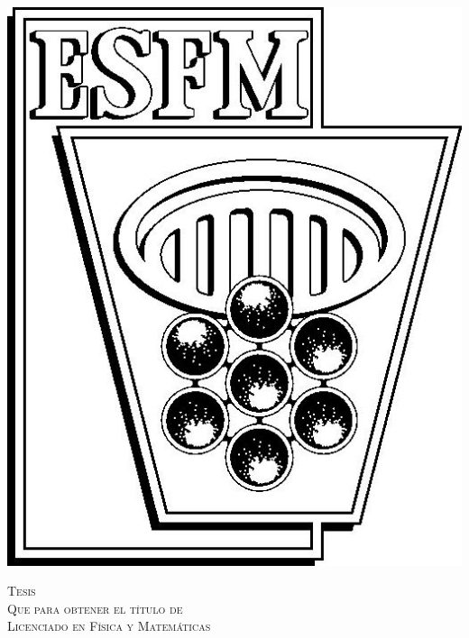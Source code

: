 \begin{center}
\begin{minipage}{0.1\textwidth}
        \centering
        \includegraphics[width=\textwidth]{img/esfm.jpg}
    \end{minipage}
    \begin{center}
    \end{center}
\end{center}

\vfill

\begin{center}
\end{center}

\vspace{20pt}

\begin{center}
    \begin{minipage}{0.7\textwidth}
        \centering
        {\Large\textsc{Tesis}} \\
        {\normalsize\textsc{Que para obtener el título de}} \\
        {\normalsize\textsc{Licenciado en Física y Matemáticas}}
        \medskip
    \end{minipage}
\end{center}

